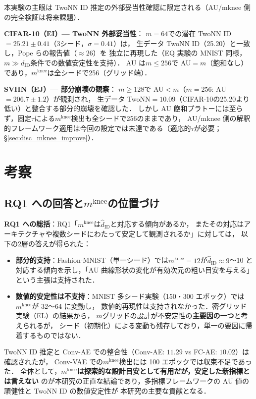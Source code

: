 \documentclass[11pt,a4paper]{jsarticle}
\newcommand{\mknee}{m^{\mathrm{knee}}}
\begin{document}
本実験の主眼は TwoNN ID 推定の外部妥当性確認に限定される（AU/mknee 側の完全検証は将来課題）．

\textbf{CIFAR-10（EI）— TwoNN 外部妥当性}：
$m=64$での潜在 TwoNN ID$=25.21\pm0.41$（3シード，$\sigma=0.41$）は，
生データ TwoNN ID（25.20）と一致し，Pope ら\cite{pope2021intrinsic}の報告値（$\approx 26$）を
独立に再現した（EQ 実験の MNIST 同様，$m \gg d_\mathrm{ID}$条件での数値安定性を支持）．
AU は$m \leq 256$で AU$=m$（飽和なし）であり，$\mknee$は全シードで256（グリッド端）．

\textbf{SVHN（EJ）— 部分崩壊の観察}：
$m \geq 128$で AU$<m$（$m=256$: AU$=206.7\pm1.2$）が観測され，
生データ TwoNN$=10.09$（CIFAR-10の25.20より低い）と整合する部分的崩壊を確認した．
しかし AU 飽和プラトーには至らず，固定$\tau$による$\mknee$検出も全シードで256のままであり，
AU/mknee 側の解釈的フレームワーク適用は今回の設定では未達である（適応的$\tau$が必要；§\ref{sec:disc_mknee_improve}）．

\section{考察}\label{sec:discussion}

\subsection{RQ1 への回答と$\mknee$の位置づけ}\label{sec:disc_mknee}

\textbf{RQ1 への総括}：RQ1「$\mknee$は$\hat{d}_\mathrm{ID}$と対応する傾向があるか，
またその対応はアーキテクチャや複数シードにわたって安定して観測されるか」に対しては，
以下の2層の答えが得られた：

\begin{itemize}
  \item \textbf{部分的支持}：Fashion-MNIST（単一シード）では$\mknee = 12$が$\hat{d}_\mathrm{ID} \approx 9$〜10
        と対応する傾向を示し，「AU 曲線形状の変化が有効次元の粗い目安を与える」という主張は支持された．
  \item \textbf{数値的安定性は不支持}：MNIST 多シード実験（150・300 エポック）では$\mknee$が 32〜64 に変動し，
        数値的再現性は支持されなかった．密グリッド実験（EL）の結果から，
        $m$グリッドの設計が不安定性の\textbf{主要因の一つ}と考えられるが，
        シード（初期化）による変動も残存しており，単一の要因に帰着するものではない．
\end{itemize}

TwoNN ID 推定と Conv-AE での整合性（Conv-AE: $11.29$ vs FC-AE: $10.02$）は確認されたが，
Conv-VAE での$\mknee$検出には 100 エポックでは収束不足であった．
全体として，\textbf{$\mknee$は探索的な設計目安として有用だが，安定した新指標とは言えない}
のが本研究の正直な結論であり，多指標フレームワークの AU 値の頑健性と TwoNN ID の数値安定性が
本研究の主要な貢献となる．
\end{document}

